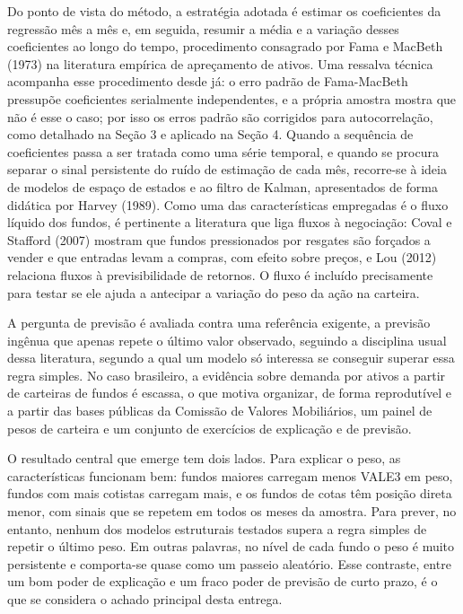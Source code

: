 \documentclass[12pt,a4paper]{article}
\begin{document}
Do ponto de vista do método, a estratégia adotada é estimar os coeficientes da regressão mês a
mês e, em seguida, resumir a média e a variação desses coeficientes ao longo do tempo,
procedimento consagrado por Fama e MacBeth (1973) na literatura empírica de apreçamento de
ativos. Uma ressalva técnica acompanha esse procedimento desde já: o erro padrão de
Fama-MacBeth pressupõe coeficientes serialmente independentes, e a própria amostra mostra que
não é esse o caso; por isso os erros padrão são corrigidos para autocorrelação, como detalhado
na Seção 3 e aplicado na Seção 4. Quando a sequência de coeficientes passa a ser tratada como
uma série temporal, e quando se procura separar o sinal persistente do ruído de estimação de
cada mês, recorre-se à ideia de modelos de espaço de estados e ao filtro de Kalman,
apresentados de forma didática por Harvey (1989). Como uma das características empregadas é o
fluxo líquido dos fundos, é pertinente a literatura que liga fluxos à negociação: Coval e
Stafford (2007) mostram que fundos pressionados por resgates são forçados a vender e que
entradas levam a compras, com efeito sobre preços, e Lou (2012) relaciona fluxos à
previsibilidade de retornos. O fluxo é incluído precisamente para testar se ele ajuda a
antecipar a variação do peso da ação na carteira.

A pergunta de previsão é avaliada contra uma referência exigente, a previsão ingênua que apenas
repete o último valor observado, seguindo a disciplina usual dessa literatura, segundo a qual
um modelo só interessa se conseguir superar essa regra simples. No caso brasileiro, a evidência
sobre demanda por ativos a partir de carteiras de fundos é escassa, o que motiva organizar, de
forma reprodutível e a partir das bases públicas da Comissão de Valores Mobiliários, um painel
de pesos de carteira e um conjunto de exercícios de explicação e de previsão.

O resultado central que emerge tem dois lados. Para explicar o peso, as características
funcionam bem: fundos maiores carregam menos VALE3 em peso, fundos com mais cotistas carregam
mais, e os fundos de cotas têm posição direta menor, com sinais que se repetem em todos os
meses da amostra. Para prever, no entanto, nenhum dos modelos estruturais testados supera a
regra simples de repetir o último peso. Em outras palavras, no nível de cada fundo o peso é
muito persistente e comporta-se quase como um passeio aleatório. Esse contraste, entre um bom
poder de explicação e um fraco poder de previsão de curto prazo, é o que se considera o achado
principal desta entrega.
\end{document}
